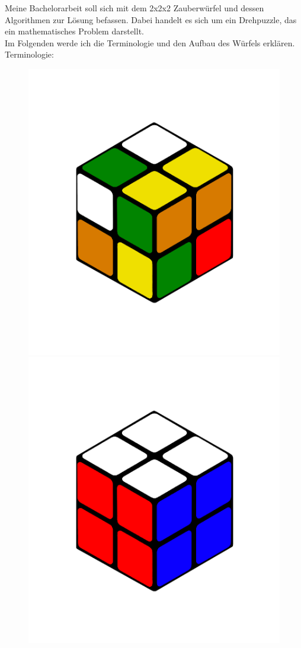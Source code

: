 \documentclass[12pt,a4paper, usenames, dvipsnames]{article}
\begin{document}
Meine Bachelorarbeit soll sich mit dem 2x2x2 Zauberwürfel und dessen Algorithmen zur Lösung befassen. Dabei handelt es sich um ein Drehpuzzle, das ein mathematisches Problem darstellt. \\ 
Im Folgenden werde ich die Terminologie und den Aufbau des Würfels erklären.\\
Terminologie:
\begin{figure}[h]
\centering
\includegraphics[scale=0.1]{2x2scrambled.png}
\includegraphics[scale=0.1]{2x2solved.png}

\end{figure}
\end{document}
